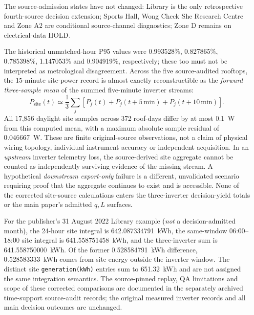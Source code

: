 \documentclass[11pt]{article}
\begin{document}
The source-admission states have not changed: Library is the only retrospective fourth-source decision extension; Sports Hall, Wong Check She Research Centre and Zone A2 are conditional source-channel diagnostics; Zone D remains on electrical-data HOLD.

The historical unmatched-hour P95 values were 0.993528\%, 0.827865\%, 0.785398\%, 1.147053\% and 0.904919\%, respectively; these too must not be interpreted as metrological disagreement. Across the five source-audited rooftops, the 15-minute site-power record is almost exactly reconstructible as the \emph{forward three-sample mean} of the summed five-minute inverter streams:
\[
P_{\mathrm{site}}(t)\simeq\frac{1}{3}\sum_j\left[P_j(t)+P_j(t+5\,\mathrm{min})+P_j(t+10\,\mathrm{min})\right].
\]
All 17,856 daylight site samples across 372 roof-days differ by at most 0.1~W from this computed mean, with a maximum absolute sample residual of 0.046667~W. These are finite original-source observations, not a claim of physical wiring topology, individual instrument accuracy or independent acquisition. In an \emph{upstream} inverter telemetry loss, the source-derived site aggregate cannot be counted as independently surviving evidence of the missing stream. A hypothetical \emph{downstream export-only} failure is a different, unvalidated scenario requiring proof that the aggregate continues to exist and is accessible. None of the corrected site-source calculations enters the three-inverter decision-yield totals or the main paper's admitted $q,L$ surfaces.

For the publisher's 31 August 2022 Library example (\emph{not} a decision-admitted month), the 24-hour site integral is 642.087334791~kWh, the same-window 06:00--18:00 site integral is 641.558751458~kWh, and the three-inverter sum is 641.558750000~kWh. Of the former 0.528584791~kWh difference, 0.528583333~kWh comes from site energy outside the inverter window. The distinct site \texttt{generation(kWh)} entries sum to 651.32~kWh and are not assigned the same integration semantics. The source-pinned replay, QA limitations and scope of these corrected comparisons are documented in the separately archived time-support source-audit records; the original measured inverter records and all main decision outcomes are unchanged.
\end{document}
